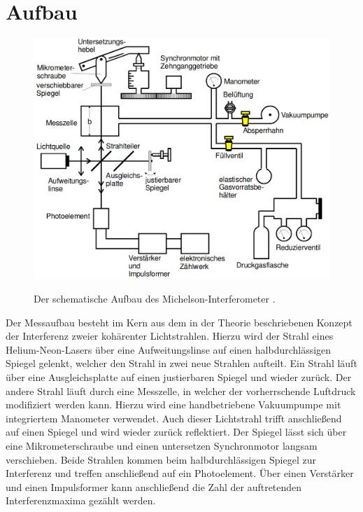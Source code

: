 \section{Aufbau}
\label{sec:Aufbau}
\begin{figure}
	\centering
	\caption{Der schematische Aufbau des Michelson-Interferometer \cite{V401}.}
	\includegraphics[width=\linewidth-150pt,height=\textheight-150pt,keepaspectratio]{content/aufbau.png}
	\label{fig:aufbau}
\end{figure}
Der Messaufbau besteht im Kern aus dem in der Theorie beschriebenen Konzept der
Interferenz zweier kohärenter Lichtstrahlen. Hierzu wird der Strahl eines Helium-Neon-Lasers
über eine Aufweitungslinse auf einen halbdurchlässigen Spiegel gelenkt, welcher den Strahl in zwei neue Strahlen aufteilt.
Ein Strahl läuft über eine Ausgleichsplatte auf einen justierbaren Spiegel und wieder zurück.
Der andere Strahl läuft durch eine Messzelle, in welcher der vorherrschende Luftdruck modifiziert werden kann.
Hierzu wird eine handbetriebene Vakuumpumpe mit integriertem Manometer verwendet.
Auch dieser Lichtstrahl trifft anschließend auf einen Spiegel und wird wieder zurück reflektiert.
Der Spiegel lässt sich über eine Mikrometerschraube und einen untersetzen Synchronmotor langsam verschieben.
Beide Strahlen kommen beim halbdurchlässigen Spiegel zur Interferenz und treffen anschließend auf ein Photoelement.
Über einen Verstärker und einen Impulsformer kann anschließend die Zahl der auftretenden Interferenzmaxima gezählt werden.
